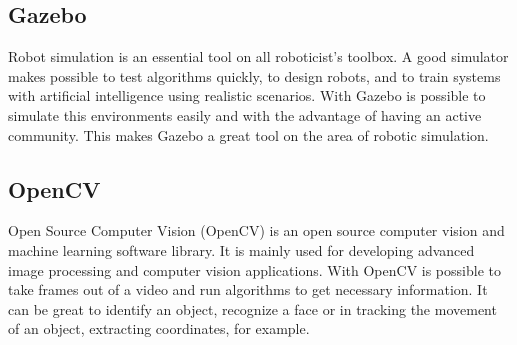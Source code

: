 \subsection*{Gazebo}

Robot simulation is an essential tool on all roboticist's toolbox.
A good simulator makes possible to test algorithms quickly, to design robots, and to train systems with artificial intelligence using realistic scenarios.
With Gazebo \cite{fairchild2016ros} is possible to simulate this environments easily and with the advantage of having an active community.
This makes Gazebo a great tool on the area of robotic simulation.

\subsection*{OpenCV}

Open Source Computer Vision (OpenCV) is an open source computer vision and machine learning software library.
It is mainly used for developing advanced image processing and computer vision applications.
With OpenCV is possible to take frames out of a video and run algorithms to get necessary information.
It can be great to identify an object, recognize a face or in tracking the movement of an object, extracting coordinates, for example.
